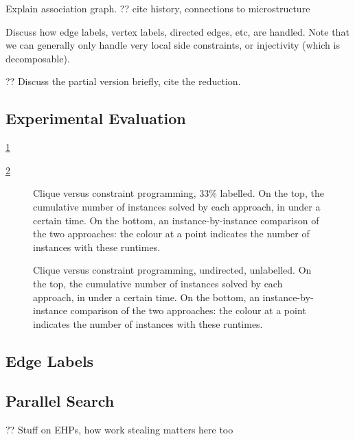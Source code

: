 \documentclass{llncs}
\begin{document}
Explain association graph. ?? cite history, connections to microstructure

Discuss how edge labels, vertex labels, directed edges, etc, are handled. Note that we can generally
only handle very local side constraints, or injectivity (which is decomposable).

?? Discuss the partial version briefly, cite the reduction.

\subsection{Experimental Evaluation}

\cref{figure:unconnected-33}

\cref{figure:unconnected-plain}

\begin{figure}[p]
    \centering
    \caption{Clique versus constraint programming, 33\% labelled. On the top, the cumulative
    number of instances solved by each approach, in under a certain time. On the bottom, an
    instance-by-instance comparison of the two approaches: the colour at a point indicates the
    number of instances with these runtimes.} \label{figure:unconnected-33}
\end{figure}

\begin{figure}[p]
    \centering
    \caption{Clique versus constraint programming, undirected, unlabelled. On the top, the cumulative
    number of instances solved by each approach, in under a certain time. On the bottom, an
        instance-by-instance comparison of the two approaches: the colour at a point indicates the
    number of instances with these runtimes.} \label{figure:unconnected-plain}
\end{figure}

\subsection{Edge Labels}

\subsection{Parallel Search}

\cite{DBLP:journals/jcc/KoncDTRJ12,DBLP:journals/algorithms/McCreeshP13,DBLP:journals/topc/McCreeshP15,DBLP:journals/cor/SegundoLP16}

?? Stuff on EHPs, how work stealing matters here too \cite{DBLP:journals/jco/BatsynGMP14}
\end{document}
